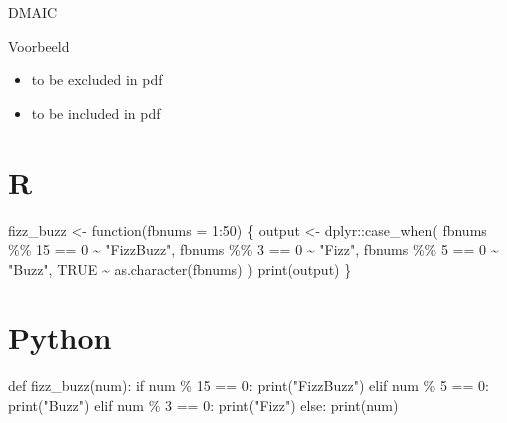 \documentclass[
  letterpaper,
  DIV=11,
  numbers=noendperiod]{scrreprt}
\newenvironment{Shaded}{\begin{snugshade}}{\end{snugshade}}
\newcommand{\AttributeTok}[1]{\textcolor[rgb]{0.40,0.45,0.13}{#1}}
\newcommand{\BuiltInTok}[1]{\textcolor[rgb]{0.00,0.23,0.31}{#1}}
\newcommand{\ConstantTok}[1]{\textcolor[rgb]{0.56,0.35,0.01}{#1}}
\newcommand{\ControlFlowTok}[1]{\textcolor[rgb]{0.00,0.23,0.31}{#1}}
\newcommand{\DecValTok}[1]{\textcolor[rgb]{0.68,0.00,0.00}{#1}}
\newcommand{\FunctionTok}[1]{\textcolor[rgb]{0.28,0.35,0.67}{#1}}
\newcommand{\KeywordTok}[1]{\textcolor[rgb]{0.00,0.23,0.31}{#1}}
\newcommand{\NormalTok}[1]{\textcolor[rgb]{0.00,0.23,0.31}{#1}}
\newcommand{\OperatorTok}[1]{\textcolor[rgb]{0.37,0.37,0.37}{#1}}
\newcommand{\OtherTok}[1]{\textcolor[rgb]{0.00,0.23,0.31}{#1}}
\newcommand{\SpecialCharTok}[1]{\textcolor[rgb]{0.37,0.37,0.37}{#1}}
\newcommand{\StringTok}[1]{\textcolor[rgb]{0.13,0.47,0.30}{#1}}
\providecommand{\tightlist}{%
  \setlength{\itemsep}{0pt}\setlength{\parskip}{0pt}}\usepackage{longtable,booktabs,array}
\begin{document}
DMAIC

Voorbeeld

\begin{itemize}
\tightlist
\item
  to be excluded in pdf
\item
  to be included in pdf
\end{itemize}

\section{R}

\begin{Shaded}
\begin{Highlighting}[]
\NormalTok{fizz\_buzz }\OtherTok{\textless{}{-}} \ControlFlowTok{function}\NormalTok{(}\AttributeTok{fbnums =} \DecValTok{1}\SpecialCharTok{:}\DecValTok{50}\NormalTok{) \{}
\NormalTok{  output }\OtherTok{\textless{}{-}}\NormalTok{ dplyr}\SpecialCharTok{::}\FunctionTok{case\_when}\NormalTok{(}
\NormalTok{    fbnums }\SpecialCharTok{\%\%} \DecValTok{15} \SpecialCharTok{==} \DecValTok{0} \SpecialCharTok{\textasciitilde{}} \StringTok{"FizzBuzz"}\NormalTok{,}
\NormalTok{    fbnums }\SpecialCharTok{\%\%} \DecValTok{3} \SpecialCharTok{==} \DecValTok{0} \SpecialCharTok{\textasciitilde{}} \StringTok{"Fizz"}\NormalTok{,}
\NormalTok{    fbnums }\SpecialCharTok{\%\%} \DecValTok{5} \SpecialCharTok{==} \DecValTok{0} \SpecialCharTok{\textasciitilde{}} \StringTok{"Buzz"}\NormalTok{,}
    \ConstantTok{TRUE} \SpecialCharTok{\textasciitilde{}} \FunctionTok{as.character}\NormalTok{(fbnums)}
\NormalTok{  )}
  \FunctionTok{print}\NormalTok{(output)}
\NormalTok{\}}
\end{Highlighting}
\end{Shaded}

\section{Python}

\begin{Shaded}
\begin{Highlighting}[]
\KeywordTok{def}\NormalTok{ fizz\_buzz(num):}
  \ControlFlowTok{if}\NormalTok{ num }\OperatorTok{\%} \DecValTok{15} \OperatorTok{==} \DecValTok{0}\NormalTok{:}
    \BuiltInTok{print}\NormalTok{(}\StringTok{"FizzBuzz"}\NormalTok{)}
  \ControlFlowTok{elif}\NormalTok{ num }\OperatorTok{\%} \DecValTok{5} \OperatorTok{==} \DecValTok{0}\NormalTok{:}
    \BuiltInTok{print}\NormalTok{(}\StringTok{"Buzz"}\NormalTok{)}
  \ControlFlowTok{elif}\NormalTok{ num }\OperatorTok{\%} \DecValTok{3} \OperatorTok{==} \DecValTok{0}\NormalTok{:}
    \BuiltInTok{print}\NormalTok{(}\StringTok{"Fizz"}\NormalTok{)}
  \ControlFlowTok{else}\NormalTok{:}
    \BuiltInTok{print}\NormalTok{(num)}
\end{Highlighting}
\end{Shaded}
\end{document}
